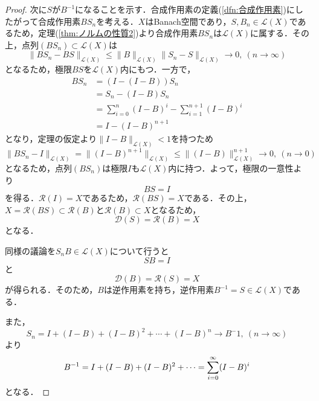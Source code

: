 \documentclass[11pt,a4paper,titlepage]{jsreport}
\theoremstyle{definition}
\begin{document}
\begin{proof}
  次に$S$が$B^{-1}$になることを示す．合成作用素の定義(\ref{dfn:合成作用素})にしたがって合成作用素$BS_n$を考える．$X$はBanach空間であり，$S,B_n\in\mathcal{L}(X)$であるため，定理(\ref{thm:ノルムの性質2})より合成作用素$BS_n$は$\mathcal{L}(X)$に属する．その上，点列$(BS_n)\subset\mathcal{L}(X)$は
  \begin{equation*}
    \|BS_n-BS\|_{\mathcal{L}(X)} \leq \|B\|_{\mathcal{L}(X)}\|S_n-S\|_{\mathcal{L}(X)}\rightarrow 0,\ (n\rightarrow \infty)
  \end{equation*}
  となるため，極限$BS$を$\mathcal{L}(X)$内にもつ．一方で，
  \begin{align*}
    BS_n & = (I-(I-B))S_n                                 \\
         & = S_n-(I-B)S_n                                 \\
         & = \sum^n_{i=0}(I-B)^i -\sum^{n+1}_{i=1}(I-B)^i \\
         & = I-(I-B)^{n+1}
  \end{align*}
  となり，定理の仮定より$\|I-B\|_{\mathcal{L}(X)}<1$を持つため
  \begin{equation*}
    \|BS_n-I\|_{\mathcal{L}(X)} = \|(I-B)^{n+1}\|_{\mathcal{L}(X)} \leq \|(I-B)\|^{n+1}_{\mathcal{L}(X)} \rightarrow 0,\ (n\rightarrow 0)
  \end{equation*}
  となるため，点列$(BS_n)$は極限$I$も$\mathcal{L}(X)$内に持つ．よって，極限の一意性より
  \begin{equation*}
    BS=I
  \end{equation*}
  を得る．$\mathcal{R}(I)=X$であるため，$\mathcal{R}(BS)=X$である．その上，$X=\mathcal{R}(BS)\subset \mathcal{R}(B)$と$\mathcal{R}(B)\subset X$となるため，
  \begin{equation*}
    \mathcal{D}(S)=\mathcal{R}(B)=X
  \end{equation*}
  となる．

  同様の議論を$S_nB\in\mathcal{L}(X)$について行うと
  \begin{equation*}
    SB=I
  \end{equation*}
  と
  \begin{equation*}
    \mathcal{D}(B)=\mathcal{R}(S)=X
  \end{equation*}
  が得られる．そのため，$B$は逆作用素を持ち，逆作用素$B^{-1}=S\in\mathcal{L}(X)$である．

  また，
  \begin{equation*}
    S_n=I+(I-B)+(I-B)^2+\cdots+(I-B)^n \rightarrow B^-1,\ (n\rightarrow\infty)
  \end{equation*}
  より
  \begin{equation*}
    B^{-1}=I+(I-B)+(I-B)^2+\cdots = \sum^{\infty}_{i=0}(I-B)^i\\
  \end{equation*}
  となる．


\end{proof}
\end{document}

